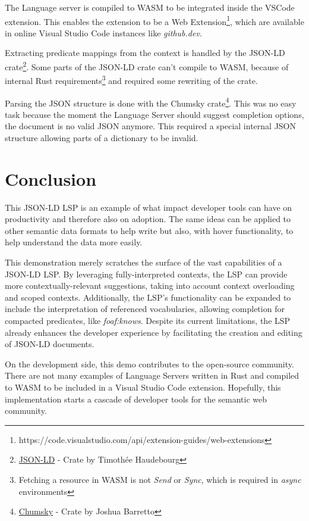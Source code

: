 \documentclass[
]{ceurart}
\begin{document}
The Language server is compiled to WASM to be integrated inside the VSCode extension.
This enables the extension to be a Web Extension\footnote{https://code.visualstudio.com/api/extension-guides/web-extensions}, which are available in online Visual Studio Code instances like \textit{github.dev}.

Extracting predicate mappings from the context is handled by the JSON-LD crate\footnote{\href{https://crates.io/crates/json-ld}{JSON-LD} - Crate by Timothée Haudebourg}.
Some parts of the JSON-LD crate can't compile to WASM, because of internal Rust requirements\footnote{Fetching a resource in WASM is not \textit{Send} or \textit{Sync}, which is required in \textit{async} environments} and required some rewriting of the crate. 

Parsing the JSON structure is done with the Chumsky crate\footnote{\href{https://github.com/zesterer/chumsky}{Chumsky} - Crate by Joshua Barretto}.
This was no easy task because the moment the Language Server should suggest completion options, the document is no valid JSON anymore. 
This required a special internal JSON structure allowing parts of a dictionary to be invalid.


\section{Conclusion}

This JSON-LD LSP is an example of what impact developer tools can have on productivity and therefore also on adoption.
The same ideas can be applied to other semantic data formats to help write but also, with hover functionality, to help understand the data more easily. 

This demonstration merely scratches the surface of the vast capabilities of a JSON-LD LSP.
By leveraging fully-interpreted contexts, the LSP can provide more contextually-relevant suggestions, taking into account context overloading and scoped contexts. 
Additionally, the LSP's functionality can be expanded to include the interpretation of referenced vocabularies, allowing completion for compacted predicates, like \textit{foaf:knows}.
Despite its current limitations, the LSP already enhances the developer experience by facilitating the creation and editing of JSON-LD documents.

On the development side, this demo contributes to the open-source community. 
There are not many examples of Language Servers written in Rust and compiled to WASM to be included in a Visual Studio Code extension.
Hopefully, this implementation starts a cascade of developer tools for the semantic web community.



\end{document}
